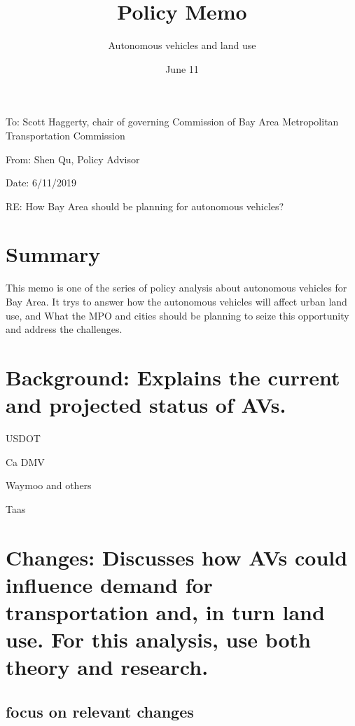 \documentclass[12pt,]{article}
\title{Policy Memo}
\subtitle{Autonomous vehicles and land use}
\author{}
\date{June 11}
\begin{document}
\maketitle

To: Scott Haggerty, chair of governing Commission of Bay Area
Metropolitan Transportation Commission

From: Shen Qu, Policy Advisor

Date: 6/11/2019

RE: How Bay Area should be planning for autonomous vehicles?

\hypertarget{summary}{%
\section{Summary}\label{summary}}

This memo is one of the series of policy analysis about autonomous
vehicles for Bay Area. It trys to answer how the autonomous vehicles
will affect urban land use, and What the MPO and cities should be
planning to seize this opportunity and address the challenges.

\hypertarget{background-explains-the-current-and-projected-status-of-avs.}{%
\section{Background: Explains the current and projected status of
AVs.}\label{background-explains-the-current-and-projected-status-of-avs.}}

USDOT

Ca DMV

Waymoo and others

Taas

\hypertarget{changes-discusses-how-avs-could-influence-demand-for-transportation-and-in-turn-land-use.-for-this-analysis-use-both-theory-and-research.}{%
\section{Changes: Discusses how AVs could influence demand for
transportation and, in turn land use. For this analysis, use both theory
and
research.}\label{changes-discusses-how-avs-could-influence-demand-for-transportation-and-in-turn-land-use.-for-this-analysis-use-both-theory-and-research.}}

\hypertarget{focus-on-relevant-changes}{%
\subsection{focus on relevant changes}\label{focus-on-relevant-changes}}
\end{document}
